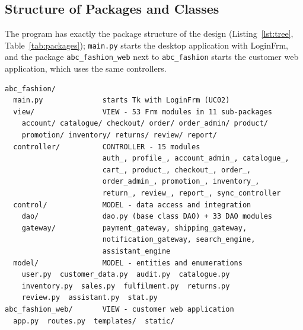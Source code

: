 \subsection{Structure of Packages and Classes}
\label{subsec:structure}
The program has exactly the package structure of the design (Listing~\ref{lst:tree}, Table~\ref{tab:packages}); \texttt{main.py} starts the desktop application with \textsf{LoginFrm}, and the package \texttt{abc\_fashion\_web} next to \texttt{abc\_fashion} starts the customer web application, which uses the same controllers.

\begin{lstlisting}[caption={Package structure of the code}, label={lst:tree}, numbers=none]
abc_fashion/
  main.py              starts Tk with LoginFrm (UC02)
  view/                VIEW - 53 Frm modules in 11 sub-packages
    account/ catalogue/ checkout/ order/ order_admin/ product/
    promotion/ inventory/ returns/ review/ report/
  controller/          CONTROLLER - 15 modules
                       auth_, profile_, account_admin_, catalogue_,
                       cart_, product_, checkout_, order_,
                       order_admin_, promotion_, inventory_,
                       return_, review_, report_, sync_controller
  control/             MODEL - data access and integration
    dao/               dao.py (base class DAO) + 33 DAO modules
    gateway/           payment_gateway, shipping_gateway,
                       notification_gateway, search_engine,
                       assistant_engine
  model/               MODEL - entities and enumerations
    user.py  customer_data.py  audit.py  catalogue.py
    inventory.py  sales.py  fulfilment.py  returns.py
    review.py  assistant.py  stat.py
abc_fashion_web/       VIEW - customer web application
  app.py  routes.py  templates/  static/
\end{lstlisting}

